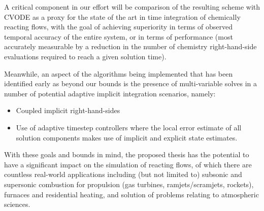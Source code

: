 A critical component in our effort will be comparison of the resulting scheme with CVODE as
a proxy for the state of the art in time integration of chemically reacting
flows, with the goal of achieving superiority in terms of observed temporal accuracy
of the entire system, or in terms of performance (most accurately measurable
by a reduction in the number of chemistry right-hand-side evaluations required
to reach a given solution time).

Meanwhile, an aspect of the algorithms being implemented that has been identified
early as beyond our bounds is the presence of multi-variable solves in a number of
potential adaptive implicit integration scenarios, namely:
\begin{itemize}
\item{Coupled implicit right-hand-sides}
\item{Use of adaptive timestep controllers where the local error estimate
      of all solution components makes use of implicit and explicit state
      estimates.}
\end{itemize}
With these goals and bounds in mind, the proposed thesis has the potential to
have a significant impact on the simulation of reacting flows, of which there
are countless real-world applications including (but not limited to) subsonic
and supersonic combustion for propulsion (gas turbines, ramjets/scramjets,
rockets), furnaces and residential heating, and solution of problems relating
to atmospheric sciences.

